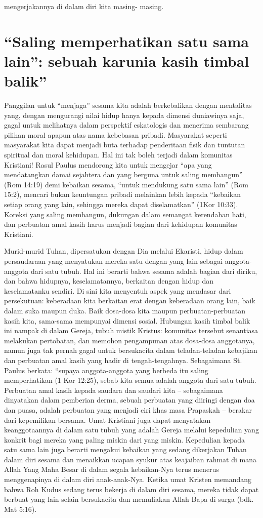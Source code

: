 mengerjakannya di dalam diri kita masing- masing.

\section{``Saling memperhatikan satu sama lain'': sebuah karunia kasih timbal balik''}

Panggilan untuk ``menjaga'' sesama kita adalah berkebalikan dengan mentalitas yang, dengan mengurangi nilai hidup hanya kepada dimensi duniawinya saja, gagal untuk melihatnya dalam perspektif eskatologis dan menerima sembarang pilihan moral apapun atas nama kebebasan pribadi. Masyarakat seperti masyarakat kita dapat menjadi buta terhadap penderitaan fisik dan tuntutan spiritual dan moral kehidupan. Hal ini tak boleh terjadi dalam komunitas Kristiani! Rasul Paulus mendorong kita untuk mengejar ``apa yang mendatangkan damai sejahtera dan yang berguna untuk saling membangun'' (Rom 14:19) demi kebaikan sesama, ``untuk mendukung satu sama lain'' (Rom 15:2), mencari bukan keuntungan pribadi melainkan lebih kepada ``kebaikan setiap orang yang lain, sehingga mereka dapat diselamatkan'' (1Kor 10:33). Koreksi yang saling membangun, dukungan dalam semangat kerendahan hati, dan perbuatan amal kasih harus menjadi bagian dari kehidupan komunitas Kristiani.

Murid-murid Tuhan, dipersatukan dengan Dia melalui Ekaristi, hidup dalam persaudaraan yang menyatukan mereka satu dengan yang lain sebagai anggota-anggota dari satu tubuh. Hal ini berarti bahwa sesama adalah bagian dari diriku, dan bahwa hidupnya, keselamatannya, berkaitan dengan hidup dan keselamatanku sendiri. Di sini kita menyentuh aspek yang mendasar dari persekutuan: keberadaan kita berkaitan erat dengan keberadaan orang lain, baik dalam suka maupun duka. Baik dosa-dosa kita maupun perbuatan-perbuatan kasih kita, sama-sama mempunyai dimensi sosial. Hubungan kasih timbal balik ini nampak di dalam Gereja, tubuh mistik Kristus: komunitas tersebut senantiasa melakukan pertobatan, dan memohon pengampunan atas dosa-dosa anggotanya, namun juga tak pernah gagal untuk bersukacita dalam teladan-teladan kebajikan dan perbuatan amal kasih yang hadir di tengah-tengahnya. Sebagaimana St. Paulus berkata: ``supaya anggota-anggota yang berbeda itu saling memperhatikan (1 Kor 12:25), sebab kita semua adalah anggota dari satu tubuh. Perbuatan amal kasih kepada saudara dan saudari kita – sebagaimana dinyatakan dalam pemberian derma, sebuah perbuatan yang diiringi dengan doa dan puasa, adalah perbuatan yang menjadi ciri khas masa Prapaskah – berakar dari kepemilikan bersama. Umat Kristiani juga dapat menyatakan keanggotaannya di dalam satu tubuh yang adalah Gereja melalui kepedulian yang konkrit bagi mereka yang paling miskin dari yang miskin. Kepedulian kepada satu sama lain juga berarti mengakui kebaikan yang sedang dikerjakan Tuhan dalam diri sesama dan menaikkan ucapan syukur atas keajaiban rahmat di mana Allah Yang Maha Besar di dalam segala kebaikan-Nya terus menerus menggenapinya di dalam diri anak-anak-Nya. Ketika umat Kristen memandang bahwa Roh Kudus sedang terus bekerja di dalam diri sesama, mereka tidak dapat berbuat yang lain selain bersukacita dan memuliakan Allah Bapa di surga (bdk. Mat 5:16).

